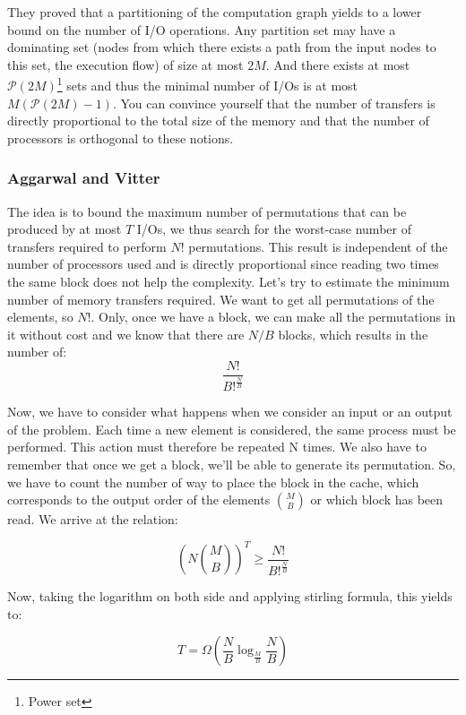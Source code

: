 They proved that a partitioning of the computation graph yields to a lower bound on the number of I/O operations. Any partition set may have a dominating set (nodes from which there exists a path from the input nodes to this set, the execution flow) of size at most $2M$. And there exists at most $\mathcal{P}(2M)$\footnote{Power set} sets and thus the minimal number of I/Os is at most $M (\mathcal{P}(2M) - 1)$. You can convince yourself that the number of transfers is directly proportional to the total size of the memory and that the number of processors is orthogonal to these notions.

\subsubsection{Aggarwal and Vitter}

The idea is to bound the maximum number of permutations that can be produced by at most $T$ I/Os, we thus search for the worst-case number of transfers required to perform $N!$ permutations. This result is independent of the number of processors used and is directly proportional since reading two times the same block does not help the complexity.
Let's try to estimate the minimum number of memory transfers required. We want to get all permutations of the elements, so $N!$. Only, once we have a block, we can make all the permutations in it without cost and we know that there are $N/B$ blocks, which results in the number of:
$$\frac{N!}{B!^{\frac{N}{B}}}$$


Now, we have to consider what happens when we consider an input or an output of the problem. Each time a new element is considered, the same process must be performed. This action must therefore be repeated N times. We also have to remember that once we get a block, we'll be able to generate its permutation. So, we have to count the number of way to place the block in the cache, which corresponds to the output order of the elements $\binom{M}{B}$ or which block has been read. We arrive at the relation:

$$ (N \binom{M}{B})^{T} \geq \frac{N!}{B!^{\frac{N}{B}}}$$

Now, taking the logarithm on both side and applying stirling formula, this yields to:

$$ T = \Omega(\frac{N}{B} \log_{\frac{M}{B}} \frac{N}{B}) $$


